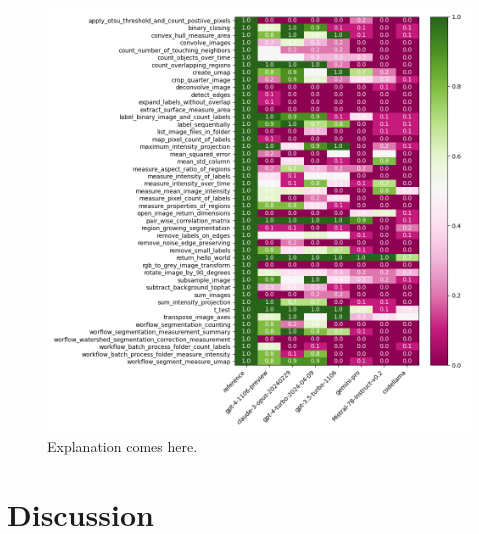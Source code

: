 \documentclass[doubleblind]{ecai}
\begin{document}
\begin{figure}[h]
\centering
\includegraphics[width=\textwidth]{performance_per_task.png}
\caption{Explanation comes here.}
\label{fig:performancepertask}
\end{figure}



\section{Discussion}
\end{document}
